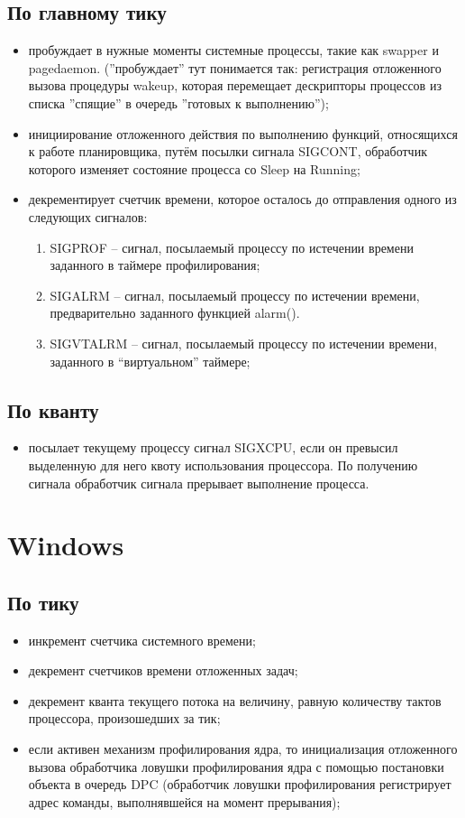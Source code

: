 \subsection*{По главному тику}
\begin{itemize}
	\item пробуждает в нужные моменты системные процессы, такие как swapper и pagedaemon. (”пробуждает” тут понимается так: регистрация отложенного вызова процедуры wakeup, которая перемещает дескрипторы процессов из списка ”спящие” в очередь ”готовых к выполнению”);
	\item инициирование отложенного действия по выполнению функций, относящихся к работе планировщика, путём посылки сигнала {\ttfamily SIGCONT}, обработчик которого изменяет состояние процесса со {\ttfamily Sleep} на {\ttfamily Running};
	\item декрементирует счетчик времени, которое осталось до отправления одного из следующих сигналов:
	\begin{enumerate}
		\item SIGPROF – сигнал, посылаемый процессу по истечении времени заданного в таймере профилирования;
		\item SIGALRM – сигнал, посылаемый процессу по истечении времени, предварительно заданного функцией alarm().
		\item SIGVTALRM – сигнал, посылаемый процессу по истечении времени, заданного в “виртуальном” таймере;
	\end{enumerate}
\end{itemize}

\subsection*{По кванту}
\begin{itemize}
	\item посылает текущему процессу сигнал SIGXCPU, если он превысил
	выделенную для него квоту использования процессора. По получению
	сигнала обработчик сигнала прерывает выполнение процесса.
\end{itemize}


\section*{Windows}
\subsection*{По тику}
\begin{itemize}
	\item инкремент счетчика системного времени;
	\item декремент счетчиков времени отложенных задач;
	\item декремент кванта текущего потока на величину, равную количеству тактов процессора, произошедших за тик;
	\item если активен механизм профилирования ядра, то инициализация отложенного вызова обработчика ловушки профилирования ядра с помощью постановки объекта в очередь DPC (обработчик ловушки профилирования регистрирует адрес команды, выполнявшейся на момент прерывания);
\end{itemize}

